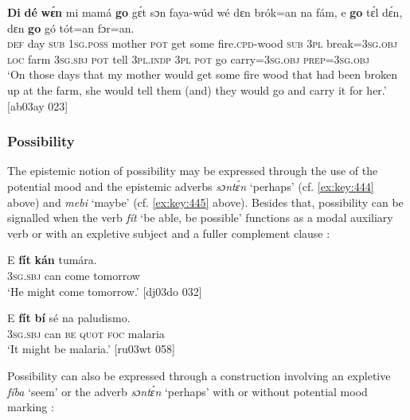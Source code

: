 \ea%
    \label{ex:key:448}
    \gll \textbf{Di}  \textbf{dé}  \textbf{wɛ́n}    mi    mamá  \textbf{go}  gɛ́t  sɔn    faya-wúd    wé
dɛn  brók=an    na  fám,    e    \textbf{go}  tɛ́l  dɛ́n,    dɛn  \textbf{go}  gó
tót=an    fɔr=an.\\
\textsc{def}  day  \textsc{sub}    \textsc{1sg.poss}  mother  \textsc{pot}  get  some  fire.\textsc{cpd}{}-wood    \textsc{sub}
\textsc{3pl}  break=\textsc{3sg.obj}  \textsc{loc}  farm  \textsc{3sg.sbj}  \textsc{pot}  tell  \textsc{3pl.indp}  \textsc{3pl}  \textsc{pot}  go
carry=\textsc{3sg.obj}  \textsc{prep=3sg.obj}\\

\glt ‘On those days that my mother would get some fire wood that had been 
broken up at the farm, she would tell them (and) they would go and carry 
it for her.’ [ab03ay 023]
\z

\subsubsection{Possibility}\label{sec:6.7.4.2}

The epistemic notion of possibility may be expressed through the use of the potential mood and the epistemic adverbs \textit{sɔntɛ́n} ‘perhaps’ (cf. \ref{ex:key:444} above) and \textit{mebi} ‘maybe’ (cf. \ref{ex:key:445} above). Besides that, possibility can be signalled when the verb \textit{fít} ‘be able, be possible’ functions as a modal auxiliary verb  or with an expletive subject and a fuller complement clause {\fff}: {\fff}


\ea%
    \label{ex:key:449}
    \gll E    \textbf{fít}  \textbf{kán}    tumára.\\
\textsc{3sg.sbj}  can  come  tomorrow\\

\glt ‘He might come tomorrow.’ [dj03do 032]
\z


\ea%
    \label{ex:key:450}
    \gll E    \textbf{fít} \textbf{bí} sé    na  paludismo.\\
\textsc{3sg.sbj}  can  \textsc{be}  \textsc{quot}    \textsc{foc}  malaria\\

\glt ‘It might be malaria.’ [ru03wt 058]
\z

Possibility can also be expressed through a construction involving an expletive \textit{fíba} ‘seem’  or the adverb \textit{sɔntɛ́n} ‘perhaps’ with or without potential mood marking :


